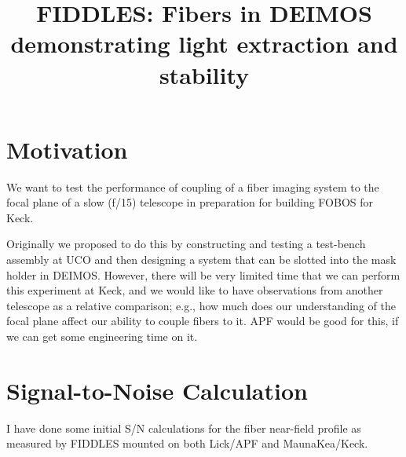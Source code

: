 \documentclass[onecolumn,floatfix,tighten]{aastex62}
\begin{document}
\title{ FIDDLES: Fibers in DEIMOS demonstrating light extraction and stability }

%

\section{Motivation}

We want to test the performance of coupling of a fiber imaging system to
the focal plane of a slow (f/15) telescope in preparation for building
FOBOS for Keck.

Originally we proposed to do this by constructing and testing a
test-bench assembly at UCO and then designing a system that can be
slotted into the mask holder in DEIMOS. However, there will be very
limited time that we can perform this experiment at Keck, and we
would like to have observations from another telescope as a relative
comparison; e.g., how much does our understanding of the focal plane
affect our ability to couple fibers to it. APF would be good for
this, if we can get some engineering time on it.

\section{Signal-to-Noise Calculation}

I have done some initial S/N calculations for the fiber near-field
profile as measured by FIDDLES mounted on both Lick/APF and
MaunaKea/Keck.

\bigskip

\end{document}
